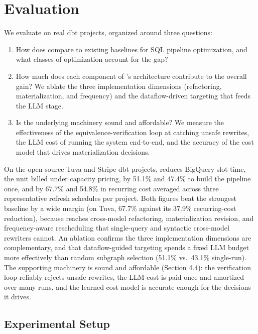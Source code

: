 \section{Evaluation}
\label{sec:eval}

We evaluate \tool{} on real dbt projects, organized around three questions:
\begin{enumerate}
    \item How does \tool{} compare to existing baselines for SQL pipeline optimization, and what classes of optimization account for the gap?
    \item How much does each component of \tool{}'s architecture contribute to the overall gain? We ablate the three  implementation dimensions  (refactoring, materialization, and frequency) and the dataflow-driven targeting that feeds the LLM stage.
    \item Is the underlying machinery sound and affordable? We measure  the effectiveness of the equivalence-verification loop at catching unsafe rewrites, the LLM cost of running the system end-to-end, and the accuracy of the cost model that drives materialization decisions.
\end{enumerate}

On the open-source Tuva and Stripe dbt projects, \tool{} reduces BigQuery slot-time, the unit billed under capacity pricing, by 51.1\% and 47.4\% to build the pipeline once, and by 67.7\% and 54.8\% in recurring cost averaged across three representative refresh schedules per project. Both figures beat the strongest baseline by a wide margin (on Tuva, 67.7\% against its 37.9\% recurring-cost reduction), because \tool{} reaches cross-model refactoring, materialization revision, and frequency-aware rescheduling that single-query and syntactic cross-model rewriters cannot. An ablation confirms the three  implementation dimensions are complementary, and that dataflow-guided targeting spends a fixed LLM budget more effectively than random subgraph selection (51.1\% vs.\ 43.1\% single-run). 
The supporting machinery is sound and affordable (Section 4.4): the verification loop reliably rejects unsafe rewrites, the LLM cost is paid once and amortized over many runs, and the learned cost model is accurate enough for the decisions it drives.




\subsection{Experimental Setup}
\label{sec:eval-setup}




